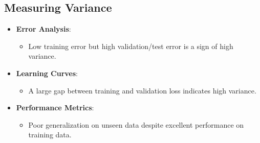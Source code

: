\subsection*{Measuring Variance}
\begin{itemize}
    \item \textbf{Error Analysis}:
    \begin{itemize}
        \item Low training error but high validation/test error is a sign of high variance.
    \end{itemize}
    \item \textbf{Learning Curves}:
    \begin{itemize}
        \item A large gap between training and validation loss indicates high variance.
    \end{itemize}
    \item \textbf{Performance Metrics}:
    \begin{itemize}
        \item Poor generalization on unseen data despite excellent performance on training data.
    \end{itemize}
\end{itemize}

